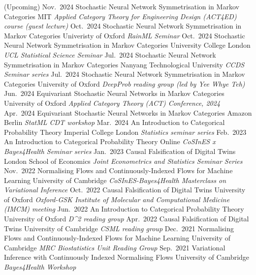 \documentclass[9pt]{developercv} %
\begin{document}
\begin{entrylist}
    \entry
        {(Upcoming) Nov.\ 2024}
        {Stochastic Neural Network Symmetrisation in Markov Categories}
        {MIT}
        {\textit{Applied Category Theory for Engineering Design (ACT4ED) course (guest lecture)}}
    \entry
        {Oct.\ 2024}
        {Stochastic Neural Network Symmetrisation in Markov Categories}
        {Univeristy of Oxford}
        {\textit{RainML Seminar}}
    \entry
        {Oct.\ 2024}
        {Stochastic Neural Network Symmetrisation in Markov Categories}
        {University College London}
        {\textit{UCL Statistical Science Seminar}}
    \entry
        {Jul.\ 2024}
        {Stochastic Neural Network Symmetrisation in Markov Categories}
        {Nanyang Technological University}
        {\textit{CCDS Seminar series}}
    \entry
        {Jul.\ 2024}
        {Stochastic Neural Network Symmetrisation in Markov Categories}
        {University of Oxford}
        {\textit{DeepProb reading group (led by Yee Whye Teh)}}
    \entry
        {Jun.\ 2024}
        {Equivariant Stochastic Neural Networks in Markov Categories}
        {University of Oxford}
        {\textit{Applied Category Theory (ACT) Conference, 2024}}
    \entry
        {Apr.\ 2024}
        {Equivariant Stochastic Neural Networks in Markov Categories}
        {Amazon Berlin}
        {\textit{StatML CDT workshop}}
    \entry
        {Mar.\ 2024}
        {An Introduction to Categorical Probability Theory}
        {Imperial College London}
        {\textit{Statistics seminar series}}
    \entry
        {Feb.\ 2023}
        {An Introduction to Categorical Probability Theory}
        {Online}
        {\textit{CoSInES x Bayes4Health Seminar series}}
    \entry
        {Jan.\ 2023}
        {Causal Falsification of Digital Twins}
        {London School of Economics}
        {\textit{Joint Econometrics and Statistics Seminar Series}}
    \entry
        {Nov.\ 2022}
        {Normalising Flows and Continuously-Indexed Flows for Machine Learning}
        {University of Cambridge}
        {\textit{CoSInES-Bayes4Health Masterclass on Variational Inference}}
    \entry
        {Oct.\ 2022}
        {Causal Falsification of Digital Twins}
        {University of Oxford}
        {\textit{Oxford-GSK Institute of Molecular and Computational Medicine (IMCM) meeting}}
    \entry
        {Jun.\ 2022}
        {An Introduction to Categorical Probability Theory}
        {University of Oxford}
        {\textit{D\textasciicircum 2 reading group}}
    \entry
        {Apr.\ 2022}
        {Causal Falsification of Digital Twins}
        {University of Cambridge}
        {\textit{CSML reading group}}
    \entry
        {Dec.\ 2021}
        {Normalising Flows and Continuously-Indexed Flows for Machine Learning}
        {University of Cambridge}
        {\textit{MRC Biostatistics Unit Reading Group}}
    \entry
        {Sep.\ 2021}%
        {Variational Inference with Continuously Indexed Normalising Flows}
        {University of Cambridge}
        {\textit{Bayes4Health Workshop}}
\end{entrylist}
\end{document}
